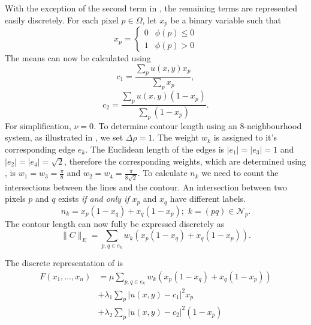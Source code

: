 \begin{definition}
	With the exception of the second term in , the remaining terms are represented easily discretely. For each pixel $p \in \Omega$, let $x_p$ be a binary variable such that
	\begin{equation}
		x_p = 
		\begin{cases} 
			0 & \phi(p)\leq 0 \\
			1 & \phi(p)> 0
		\end{cases}
	\end{equation}
	The means can now be calculated using 
	\begin{equation}
		c_1 = \frac{\sum_p u(x,y)x_p}{\sum_p x_p},
	\end{equation}
	\begin{equation}
		c_2 = \frac{\sum_p u(x,y)(1-x_p)}{\sum_p (1-x_p)}.
	\end{equation}
	For simplification, $\nu=0$. To determine contour length using an 8-neighbourhood system, as illustrated in , we set $\Delta\rho=1$. The weight $w_k$ is assigned to it's corresponding edge $e_k$. The Euclidean length of the  edges is $|e_1|=|e_3| = 1$ and $|e_2|=|e_4|=\sqrt{2}$, therefore the corresponding weights, which are determined using , is $w_1 = w_3 = \frac{\pi}{8}$ and $w_2 = w_4 = \frac{\pi}{8\sqrt{2}}$. To calculate $n_k$ we need to count the intersections between the lines and the contour. An intersection between two pixels $p$ and $q$ exists \textit{if and only if} $x_p$ and $x_q$ have different labels.
	\begin{equation}
		n_{k} = x_p(1-x_q) + x_q(1-x_p) \text{; } \, k={(pq) \in \mathcal{N}_p}. 
	\end{equation}
	The contour length can now fully be expressed discretely as 
	\begin{equation}
		\lVert C \rVert_E = \sum_{p,q \in e_k} w_k( x_p(1-x_q) + x_q(1-x_p)).
	\end{equation}
	
	The discrete representation of  is
	\begin{equation}
		\begin{split}
			F(x_1, \ldots, x_n) & = \mu \sum_{p,q \in e_k} w_k( x_p(1-x_q) + x_q(1-x_p)) \\
			& + \lambda_1 \sum_p |u(x,y)-c_1|^2x_p \\
			& + \lambda_2 \sum_p |u(x,y)-c_2|^2(1-x_p)
		\end{split}
		\label{eq:discretemumfordshah}
	\end{equation}
\end{definition}

